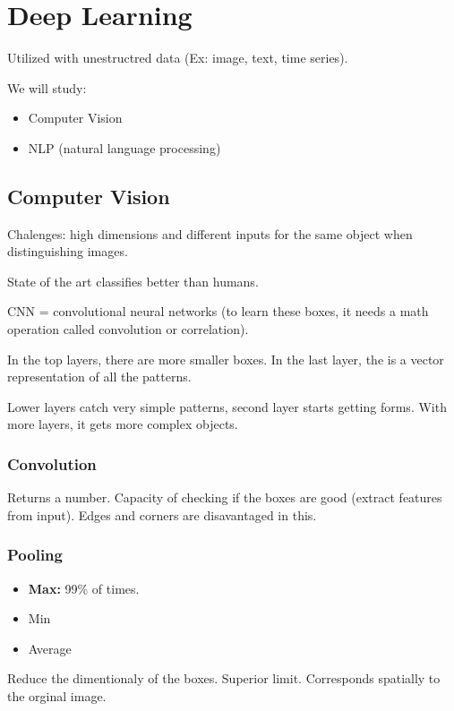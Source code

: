 \documentclass[11pt]{article}
\date{\today}
\title{}
\begin{document}
\tableofcontents


\section{Deep Learning}
\label{sec:org2ee12e0}
Utilized with unestructred data (Ex: image, text, time series).

We will study:
\begin{itemize}
\item Computer Vision
\item NLP (natural language processing)
\end{itemize}

\subsection{Computer Vision}
\label{sec:org0ceb043}
Chalenges: high dimensions and different inputs for the same object when
distinguishing images.

State of the art classifies better than humans.

CNN = convolutional neural networks (to learn these boxes, it needs a math operation
called convolution or correlation).

In the top layers, there are more smaller boxes. In the last layer, the is a vector
representation of all the patterns.

Lower layers catch very simple patterns, second layer starts getting forms. With more
layers, it gets more complex objects.

\subsubsection{Convolution}
\label{sec:org68a90c4}
Returns a number. Capacity of checking if the boxes are good (extract features from
input). Edges and corners are disavantaged in this.

\subsubsection{Pooling}
\label{sec:org0948903}
\begin{itemize}
\item \textbf{Max:} 99\% of times.
\item Min
\item Average
\end{itemize}

Reduce the dimentionaly of the boxes. Superior limit. Corresponds spatially to the
orginal image.
\end{document}
